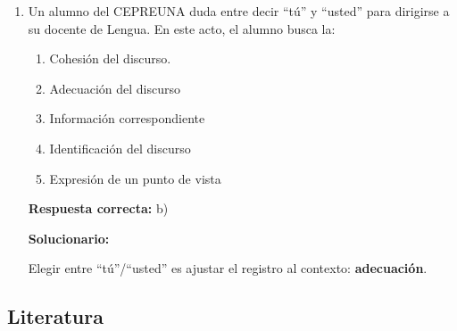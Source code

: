 \begin{enumerate}[resume]
\textbf{Respuesta correcta:} c)

\vspace{2mm}
\textbf{Solucionario:}

Usa terminología científica (\textbf{átomos}, \textbf{moléculas}), por eso es \textbf{técnico}.

\item  Un alumno del CEPREUNA duda entre decir ``tú'' y ``usted'' para dirigirse a su docente de Lengua. En este acto, el alumno busca la:
\begin{enumerate}[label=\alph*)]
	\item Cohesión del discurso.
	\item Adecuación del discurso
	\item Información correspondiente
	\item Identificación del discurso
	\item Expresión de un punto de vista
\end{enumerate}

\textbf{Respuesta correcta:} b)

\vspace{2mm}
\textbf{Solucionario:}

Elegir entre ``tú''/``usted'' es ajustar el registro al contexto: \textbf{adecuación}.

\end{enumerate}



\subsection*{Literatura}

